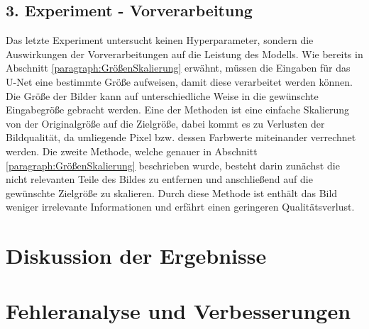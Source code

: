 \subsection{3. Experiment - Vorverarbeitung}
Das letzte Experiment untersucht keinen Hyperparameter, sondern die Auswirkungen der Vorverarbeitungen auf die Leistung des \gls{Modell}s. Wie bereits in Abschnitt \ref{paragraph:GrößenSkalierung} erwähnt, müssen die Eingaben für das U-Net eine bestimmte Größe aufweisen, damit diese verarbeitet werden können. Die Größe der Bilder kann auf unterschiedliche Weise in die gewünschte Eingabegröße gebracht werden. Eine der Methoden ist eine einfache Skalierung von der Originalgröße auf die Zielgröße, dabei kommt es zu Verlusten der Bildqualität, da umliegende Pixel bzw. dessen Farbwerte miteinander verrechnet werden. Die zweite Methode, welche genauer in Abschnitt \ref{paragraph:GrößenSkalierung} beschrieben wurde, besteht darin zunächst die nicht relevanten Teile des Bildes zu entfernen und anschließend auf die gewünschte Zielgröße zu skalieren. Durch diese Methode ist enthält das Bild weniger irrelevante Informationen und erfährt einen geringeren Qualitätsverlust. 


\section{Diskussion der Ergebnisse}
\section{Fehleranalyse und Verbesserungen}
